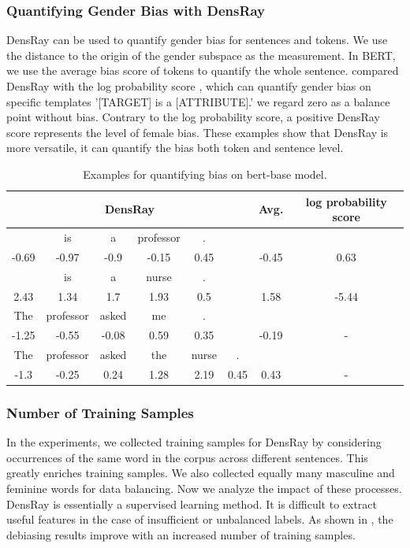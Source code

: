 \subsubsection{Quantifying Gender Bias with DensRay}
DensRay can be used to quantify gender bias for sentences and tokens. We use the distance to the origin of the gender subspace as the measurement. In BERT, we use the average bias score of tokens to quantify the whole sentence.  compared DensRay with the log probability score \cite{kurita2019measuring}, which can quantify gender bias on specific templates '[TARGET] is a [ATTRIBUTE].' we regard zero as a balance point without bias. Contrary to the log probability score, a positive DensRay score represents the level of female bias. These examples show that DensRay is more versatile, it can quantify the bias both token and sentence level.
\begin{table}[h]
	\centering
	\scriptsize
	\begin{tabular}{cccccc|c||c}
		\hline
		\multicolumn{6}{c|}{DensRay}&Avg.&log probability score\\		
		\hline\hline
		[MASK] &is &a &professor& . &&&\\
		-0.69 &-0.97 &-0.9  &-0.15  &0.45& &-0.45& 0.63\\
		\hline
		[MASK] &is &a &nurse& . &&&\\
		2.43  &1.34  &1.7   &1.93  &0.5&& 1.58 &-5.44\\
		\hline
		The &professor &asked &me& . &&&\\
		-1.25 &-0.55 &-0.08  &0.59  &0.35 &&-0.19 &-\\
		\hline
		The &professor &asked &the&nurse &.&&\\
		-1.3&  -0.25  &0.24  &1.28  &2.19  &0.45&0.43&-\\
		\hline
	\end{tabular}
	\caption{
		Examples for quantifying bias on bert-base model.}
\end{table}



\subsubsection{Number of Training Samples}
In the experiments, we collected training samples for DensRay by considering occurrences of the same word in the corpus across different sentences. This greatly enriches training samples. We also collected equally many masculine and feminine words for data balancing. Now we analyze the impact of these processes. DensRay is essentially a supervised learning method. It is difficult to extract useful features in the case of insufficient or unbalanced labels.  As shown in , the debiasing results improve with an increased number of training samples.

